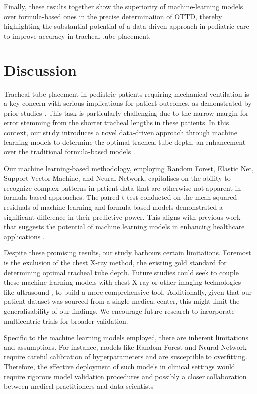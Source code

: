 \documentclass[11pt]{article}
\begin{document}
Finally, these results together show the superiority of machine-learning models over formula-based ones in the precise determination of OTTD, thereby highlighting the substantial potential of a data-driven approach in pediatric care to improve accuracy in tracheal tube placement.

\section*{Discussion}

Tracheal tube placement in pediatric patients requiring mechanical ventilation is a key concern with serious implications for patient outcomes, as demonstrated by prior studies \cite{Baumeister1997EvaluationOP, Arnold1994ProspectiveRC}. This task is particularly challenging due to the narrow margin for error stemming from the shorter tracheal lengths in these patients. In this context, our study introduces a novel data-driven approach through machine learning models to determine the optimal tracheal tube depth, an enhancement over the traditional formula-based models \cite{Christian2020UseAO}. 

Our machine learning-based methodology, employing Random Forest, Elastic Net, Support Vector Machine, and Neural Network, capitalises on the ability to recognize complex patterns in patient data that are otherwise not apparent in formula-based approaches. The paired t-test conducted on the mean squared residuals of machine learning and formula-based models demonstrated a significant difference in their predictive power. This aligns with previous work that suggests the potential of machine learning models in enhancing healthcare applications \cite{Lin2016BedsideUF, Crowson2021MachineLF}.

Despite these promising results, our study harbours certain limitations. Foremost is the exclusion of the chest X-ray method, the existing gold standard for determining optimal tracheal tube depth. Future studies could seek to couple these machine learning models with chest X-ray or other imaging technologies like ultrasound \cite{Lin2016BedsideUF}, to build a more comprehensive tool. Additionally, given that our patient dataset was sourced from a single medical center, this might limit the generalisability of our findings. We encourage future research to incorporate multicentric trials for broader validation.

Specific to the machine learning models employed, there are inherent limitations and assumptions. For instance, models like Random Forest and Neural Network require careful calibration of hyperparameters and are susceptible to overfitting. Therefore, the effective deployment of such models in clinical settings would require rigorous model validation procedures and possibly a closer collaboration between medical practitioners and data scientists. 
\end{document}
